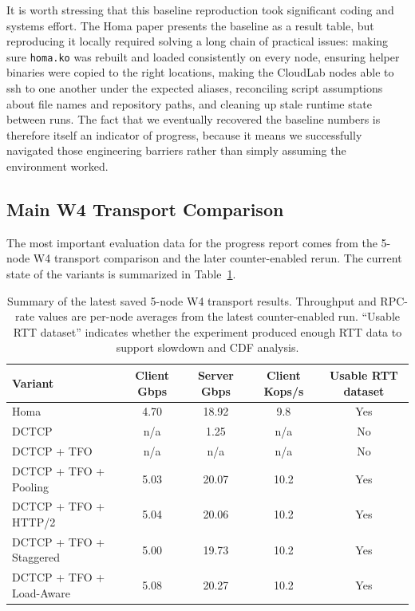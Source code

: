 \documentclass[11pt]{article}
\begin{document}
It is worth stressing that this baseline reproduction took significant coding and systems effort. The Homa paper presents the baseline as a result table, but reproducing it locally required solving a long chain of practical issues: making sure \texttt{homa.ko} was rebuilt and loaded consistently on every node, ensuring helper binaries were copied to the right locations, making the CloudLab nodes able to ssh to one another under the expected aliases, reconciling script assumptions about file names and repository paths, and cleaning up stale runtime state between runs. The fact that we eventually recovered the baseline numbers is therefore itself an indicator of progress, because it means we successfully navigated those engineering barriers rather than simply assuming the environment worked.

\subsection{Main W4 Transport Comparison}

The most important evaluation data for the progress report comes from the 5-node W4 transport comparison and the later counter-enabled rerun. The current state of the variants is summarized in Table~\ref{tab:transport-summary}.

\begin{table}[H]
\centering
\caption{Summary of the latest saved 5-node W4 transport results. Throughput and RPC-rate values are per-node averages from the latest counter-enabled run. ``Usable RTT dataset'' indicates whether the experiment produced enough RTT data to support slowdown and CDF analysis.}
\label{tab:transport-summary}
\begin{tabular}{p{4.0cm}cccc}
\toprule
Variant & Client Gbps & Server Gbps & Client Kops/s & Usable RTT dataset \\
\midrule
Homa & 4.70 & 18.92 & 9.8 & Yes \\
DCTCP & n/a & 1.25 & n/a & No \\
DCTCP + TFO & n/a & n/a & n/a & No \\
DCTCP + TFO + Pooling & 5.03 & 20.07 & 10.2 & Yes \\
DCTCP + TFO + HTTP/2 & 5.04 & 20.06 & 10.2 & Yes \\
DCTCP + TFO + Staggered & 5.00 & 19.73 & 10.2 & Yes \\
DCTCP + TFO + Load-Aware & 5.08 & 20.27 & 10.2 & Yes \\
\bottomrule
\end{tabular}
\end{table}
\end{document}

